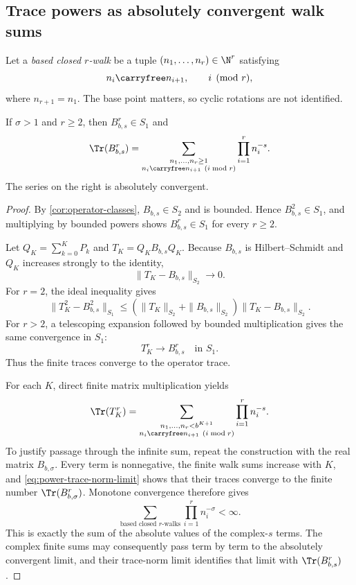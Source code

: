 \subsection{Trace powers as absolutely convergent walk sums}

Let a \emph{based closed \(r\)-walk} be a tuple
\((n_1,\ldots,n_r)\in\N^r\) satisfying
\[
  n_i\carryfree n_{i+1},
  \qquad i\pmod r,
\]
where \(n_{r+1}=n_1\).  The base point matters, so cyclic rotations are
not identified.

\begin{proposition}
\label{prop:trace-powers}
If \(\sigma>1\) and \(r\ge2\), then \(B_{b,s}^r\in S_1\) and
\begin{equation}
  \Tr(B_{b,s}^r)
  =
  \sum_{\substack{n_1,\ldots,n_r\ge1\\
                  n_i\carryfree n_{i+1}\ (i\bmod r)}}
  \prod_{i=1}^{r}n_i^{-s}.
  \label{eq:closed-walk-trace}
\end{equation}
The series on the right is absolutely convergent.
\end{proposition}

\begin{proof}
By \cref{cor:operator-classes}, \(B_{b,s}\in S_2\) and is bounded.  Hence
\(B_{b,s}^2\in S_1\), and multiplying by bounded powers shows
\(B_{b,s}^r\in S_1\) for every \(r\ge2\).

Let \(Q_K=\sum_{k=0}^{K}P_k\) and
\(T_K=Q_KB_{b,s}Q_K\).  Because \(B_{b,s}\) is Hilbert--Schmidt and
\(Q_K\) increases strongly to the identity,
\[
  \|T_K-B_{b,s}\|_{S_2}\longrightarrow0.
\]
For \(r=2\), the ideal inequality gives
\[
  \|T_K^2-B_{b,s}^2\|_{S_1}
  \le
  (\|T_K\|_{S_2}+\|B_{b,s}\|_{S_2})
  \|T_K-B_{b,s}\|_{S_2}.
\]
For \(r>2\), a telescoping expansion followed by bounded multiplication
gives the same convergence in \(S_1\):
\begin{equation}
  T_K^r\longrightarrow B_{b,s}^r
  \quad\text{in }S_1.
  \label{eq:power-trace-norm-limit}
\end{equation}
Thus the finite traces converge to the operator trace.

For each \(K\), direct finite matrix multiplication yields
\[
  \Tr(T_K^r)
  =
  \sum_{\substack{n_1,\ldots,n_r<b^{K+1}\\
                  n_i\carryfree n_{i+1}\ (i\bmod r)}}
  \prod_{i=1}^{r}n_i^{-s}.
\]
To justify passage through the infinite sum, repeat the construction with
the real matrix \(B_{b,\sigma}\).  Every term is nonnegative, the finite
walk sums increase with \(K\), and
\cref{eq:power-trace-norm-limit} shows that their traces converge to the
finite number \(\Tr(B_{b,\sigma}^r)\).  Monotone convergence therefore
gives
\[
  \sum_{\text{based closed \(r\)-walks}}
  \prod_{i=1}^{r}n_i^{-\sigma}<\infty.
\]
This is exactly the sum of the absolute values of the complex-\(s\) terms.
The complex finite sums may consequently pass term by term to the
absolutely convergent limit, and their trace-norm limit identifies that
limit with \(\Tr(B_{b,s}^r)\).
\end{proof}

